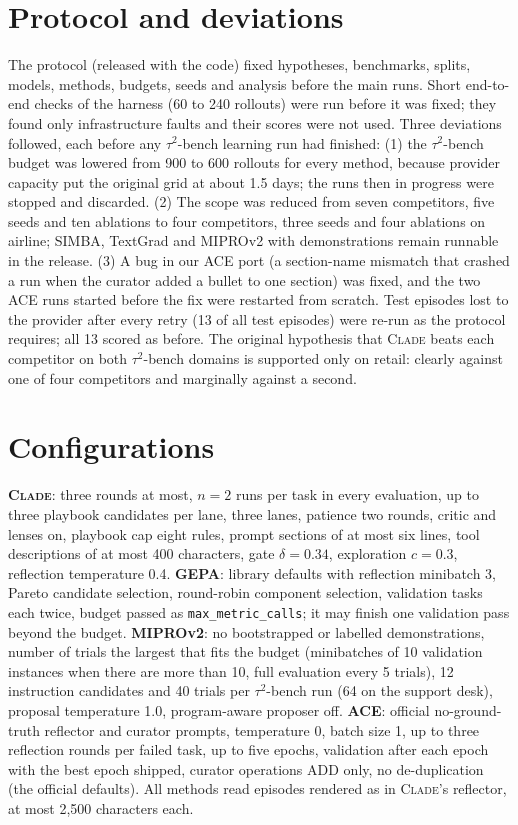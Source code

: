 \documentclass[11pt]{article}
\newcommand{\clade}{\textsc{Clade}\xspace}
\newcommand{\taub}{$\tau^2$-bench\xspace}
\begin{document}


\appendix

\section{Protocol and deviations}
\label{app:protocol}

The protocol (released with the code) fixed hypotheses, benchmarks, splits, models, methods, budgets, seeds and
analysis before the main runs. Short end-to-end checks of the harness (60 to 240 rollouts) were run before it was
fixed; they found only infrastructure faults and their scores were not used. Three deviations followed, each before
any \taub learning run had finished: (1) the \taub budget was lowered from 900 to 600 rollouts for every method,
because provider capacity put the original grid at about 1.5 days; the runs then in progress were stopped and
discarded. (2) The scope was reduced from seven competitors, five seeds and ten ablations to four competitors, three
seeds and four ablations on airline; SIMBA, TextGrad and MIPROv2 with demonstrations remain runnable in the release.
(3) A bug in our ACE port (a section-name mismatch that crashed a run when the curator added a bullet to one section)
was fixed, and the two ACE runs started before the fix were restarted from scratch. Test episodes lost to the
provider after every retry (13 of all test episodes) were re-run as the protocol requires; all 13 scored as before.
The original hypothesis that \clade beats each competitor on both \taub domains is supported only on retail:
clearly against one of four competitors and marginally against a second.

\section{Configurations}
\label{app:config}

\textbf{\clade}: three rounds at most, $n=2$ runs per task in every evaluation, up to three playbook candidates per
lane, three lanes, patience two rounds, critic and lenses on, playbook cap eight rules, prompt sections of at most six
lines, tool descriptions of at most 400 characters, gate $\delta=0.34$, exploration $c=0.3$, reflection temperature
0.4. \textbf{GEPA}: library defaults with reflection minibatch 3, Pareto candidate selection, round-robin component
selection, validation tasks each twice, budget passed as \texttt{max\_metric\_calls}; it may finish one validation
pass beyond the budget. \textbf{MIPROv2}: no bootstrapped or labelled demonstrations, number of trials the largest
that fits the budget (minibatches of 10 validation instances when there are more than 10, full evaluation every 5
trials), 12 instruction candidates and 40 trials per \taub run (64 on the support desk), proposal temperature 1.0, program-aware proposer off. \textbf{ACE}: official no-ground-truth reflector and
curator prompts, temperature 0, batch size 1, up to three reflection rounds per failed task, up to five epochs,
validation after each epoch with the best epoch shipped, curator operations ADD only, no de-duplication (the official
defaults). All methods read episodes rendered as in \clade's reflector, at most 2{,}500 characters each.
\end{document}
